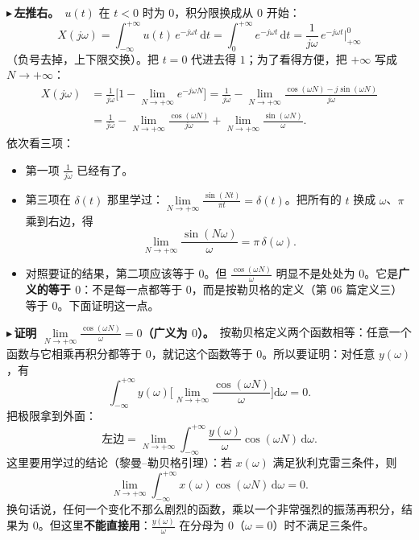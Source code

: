 \documentclass[UTF8,a4paper,11pt]{ctexart}
\newcommand{\dd}{\mathrm{d}}
\newcounter{ex}[section]
\newcommand{\point}[1]{\par\addvspace{1ex}\noindent\textcolor{ptteal}{$\blacktriangleright$\,\textbf{#1}}\ }
\begin{document}
\point{左推右。}$u(t)$ 在 $t<0$ 时为 $0$，积分限换成从 $0$ 开始：
\[
X(j\omega)=\int_{-\infty}^{+\infty}u(t)\,e^{-j\omega t}\,\dd t=\int_0^{+\infty}e^{-j\omega t}\,\dd t
=\frac1{j\omega}\,e^{-j\omega t}\Big|_{+\infty}^{0}
\]
（负号去掉，上下限交换）。把 $t=0$ 代进去得 $1$；为了看得方便，把 $+\infty$ 写成 $N\to+\infty$：
\[
\begin{aligned}
X(j\omega)&=\frac1{j\omega}\Big[1-\lim_{N\to+\infty}e^{-j\omega N}\Big]
=\frac1{j\omega}-\lim_{N\to+\infty}\frac{\cos(\omega N)-j\sin(\omega N)}{j\omega}\\
&=\frac1{j\omega}-\lim_{N\to+\infty}\frac{\cos(\omega N)}{j\omega}+\lim_{N\to+\infty}\frac{\sin(\omega N)}{\omega}.
\end{aligned}
\]
依次看三项：
\begin{itemize}[nosep]
\item 第一项 $\frac1{j\omega}$ 已经有了。
\item 第三项在 $\delta(t)$ 那里学过：$\lim\limits_{N\to+\infty}\frac{\sin(Nt)}{\pi t}=\delta(t)$。把所有的 $t$ 换成 $\omega$、$\pi$ 乘到右边，得
\[
\lim_{N\to+\infty}\frac{\sin(N\omega)}{\omega}=\pi\,\delta(\omega).
\]
\item 对照要证的结果，第二项应该等于 $0$。但 $\frac{\cos(\omega N)}{\omega}$ 明显不是处处为 $0$。它是\textbf{广义的等于 $0$}：不是每一点都等于 $0$，而是按勒贝格的定义（第 06 篇定义三）等于 $0$。下面证明这一点。
\end{itemize}

\point{证明 $\lim\limits_{N\to+\infty}\frac{\cos(\omega N)}{\omega}=0$（广义为 $0$）。}按勒贝格定义两个函数相等：任意一个函数与它相乘再积分都等于 $0$，就记这个函数等于 $0$。所以要证明：对任意 $y(\omega)$，有
\[
\int_{-\infty}^{+\infty}y(\omega)\Big[\lim_{N\to+\infty}\frac{\cos(\omega N)}{\omega}\Big]\dd\omega=0 .
\]
把极限拿到外面：
\[
\text{左边}=\lim_{N\to+\infty}\int_{-\infty}^{+\infty}\frac{y(\omega)}{\omega}\cos(\omega N)\,\dd\omega .
\]
这里要用学过的结论（黎曼--勒贝格引理）：若 $x(\omega)$ 满足狄利克雷三条件，则
\[
\lim_{N\to+\infty}\int_{-\infty}^{+\infty}x(\omega)\cos(\omega N)\,\dd\omega=0 .
\]
换句话说，任何一个变化不那么剧烈的函数，乘以一个非常强烈的振荡再积分，结果为 $0$。但这里\textbf{不能直接用}：$\frac{y(\omega)}{\omega}$ 在分母为 $0$（$\omega=0$）时不满足三条件。
\end{document}
